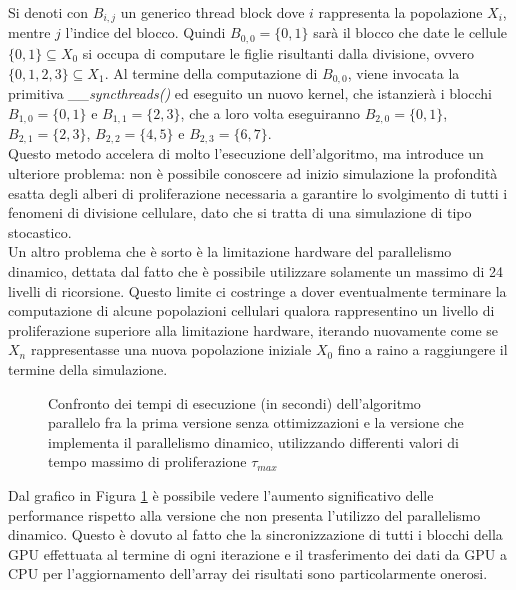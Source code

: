Si denoti con $B_{i,j}$ un generico thread block dove
$i$ rappresenta la popolazione $X_{i}$, mentre $j$ l'indice del blocco.
Quindi $B_{0,0} = \{0, 1\}$ sarà il blocco che date le
cellule $\{0, 1\} \subseteq X_{0}$ si occupa di
computare le figlie risultanti dalla divisione, ovvero
$\{0, 1, 2, 3\} \subseteq X_{1}$.
Al termine della computazione di $B_{0,0}$, viene invocata la primitiva 
\textit{\_\_syncthreads()} ed eseguito un nuovo kernel, che istanzierà
i blocchi $B_{1,0} = \{0, 1\}$ e $B_{1,1} = \{2, 3\}$, che a loro volta
eseguiranno $B_{2,0} = \{0, 1\}$, $B_{2,1} = \{2, 3\}$,
$B_{2,2} = \{4, 5\}$ e $B_{2,3} = \{6, 7\}$.
\\
Questo metodo accelera di molto l'esecuzione dell'algoritmo, ma introduce un
ulteriore problema: non è possibile conoscere ad inizio simulazione la
profondità esatta degli alberi di proliferazione necessaria a garantire lo
svolgimento di tutti i fenomeni di divisione cellulare, dato che si tratta di
una simulazione di tipo stocastico.
\\
Un altro problema che è sorto è la limitazione hardware del parallelismo
dinamico, dettata dal fatto che è possibile utilizzare solamente un massimo
di 24 livelli di ricorsione. Questo limite ci costringe a dover
eventualmente terminare la computazione di alcune popolazioni cellulari qualora
rappresentino un livello di proliferazione superiore alla limitazione hardware,
iterando nuovamente come se $X_{n}$ rappresentasse una nuova
popolazione iniziale $X_{0}$ fino a raino a raggiungere il termine della simulazione.

\begin{figure}[t]
    \centering
    \caption{Confronto dei tempi di esecuzione (in secondi) dell'algoritmo
    parallelo fra la prima versione senza ottimizzazioni e la versione
    che implementa il parallelismo dinamico, utilizzando differenti valori di
    tempo massimo di proliferazione $\tau_{max}$}
    \label{chart:original-dynamic}
\end{figure}
Dal grafico in Figura \ref{chart:original-dynamic} è possibile vedere
l'aumento significativo delle
performance rispetto alla versione che non presenta l'utilizzo del
parallelismo dinamico. Questo è dovuto al fatto che la
sincronizzazione di tutti i blocchi della GPU effettuata al termine di ogni
iterazione e il trasferimento
dei dati da GPU a CPU per l'aggiornamento dell'array dei risultati sono
particolarmente onerosi.

